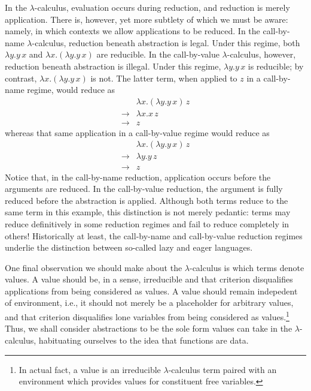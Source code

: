 \documentclass[ms,electronic,twosidetoc,letterpaper,chaptercenter,parttop]{byumsphd}
\begin{document}
In the $\lambda$-calculus, evaluation occurs during reduction, and reduction is merely
application. There is, however, yet more subtlety of which we must be aware: namely, in
which contexts we allow applications to be reduced. In the call-by-name
$\lambda$-calculus, reduction beneath abstraction is legal. Under this regime, both
$\lambda y.y\,x$ and $\lambda x.(\lambda y.y\,x)$ are reducible. In the call-by-value
$\lambda$-calculus, however, reduction beneath abstraction is illegal. Under this regime,
$\lambda y.y\,x$ is reducible; by contrast, $\lambda x.(\lambda y.y\,x)$ is not.  The
latter term, when applied to $z$ in a call-by-name regime, would reduce as
\begin{align*}
            &\lambda x.(\lambda y.y\, x)\,z\\
\rightarrow &\lambda x.x\,z\\
\rightarrow &z
\end{align*}
whereas that same application in a call-by-value regime would reduce as
\begin{align*}
            &\lambda x.(\lambda y.y\, x)\,z\\
\rightarrow &\lambda y.y\,z\\
\rightarrow &z
\end{align*}
Notice that, in the call-by-name reduction, application occurs before the arguments are
reduced. In the call-by-value reduction, the argument is fully reduced before the
abstraction is applied. Although both terms reduce to the same term in this example, this
distinction is not merely pedantic: terms may reduce definitively in some reduction
regimes and fail to reduce completely in others! Historically at least, the call-by-name
and call-by-value reduction regimes underlie the distinction between so-called lazy and
eager languages.

One final observation we should make about the $\lambda$-calculus is which terms denote
values. A value should be, in a sense, irreducible and that criterion disqualifies
applications from being considered as values. A value should remain indepedent of
environment, i.e., it should not merely be a placeholder for arbitrary values, and that
criterion disqualifies lone variables from being considered as values.\footnote{In actual
fact, a value is an irreducible $\lambda$-calculus term paired with an environment which
provides values for constituent free variables.} Thus, we shall consider abstractions to
be the sole form values can take in the $\lambda$-calculus, habituating ourselves to the
idea that functions are data.
\end{document}
